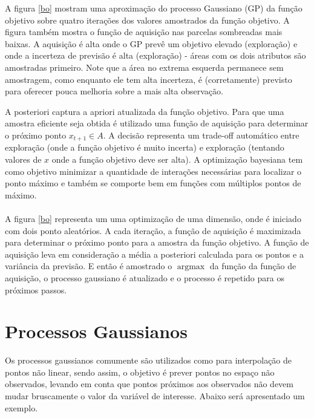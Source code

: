 \documentclass[
	12pt,				%
	twoside,		%
	a4paper,		%
	chapter=TITLE,		   %
	section=TITLE,		   %
	subsection=TITLE,	   %
	subsubsection=TITLE, %
	english,			%
	french,				%
	spanish,			%
	brazil,				%
]{abntex2}
\begin{document}
A figura \ref{bo} mostram uma aproximação do processo Gaussiano (GP) da
função objetivo sobre quatro iterações dos valores amostrados da função
objetivo. A figura também mostra o função de aquisição nas parcelas
sombreadas mais baixas. A aquisição é alta onde o GP prevê um objetivo
elevado (exploração) e onde a incerteza de previsão é alta (exploração)
- áreas com os dois atributos são amostradas primeiro. Note que a área
no extrema esquerda permanece sem amostragem, como enquanto ele tem alta
incerteza, é (corretamente) previsto para oferecer pouca melhoria sobre
a mais alta observação.

A posteriori captura a apriori atualizada da função objetivo. Para que
uma amostra eficiente seja obtida é utilizado uma função de aquisição
para determinar o próximo ponto \(x_{t+1} \in A\). A decisão representa
um trade-off automático entre exploração (onde a função objetivo é muito
incerta) e exploração (tentando valores de \(x\) onde a função objetivo
deve ser alta). A optimização bayesiana tem como objetivo minimizar a
quantidade de interações necessárias para localizar o ponto máximo e
também se comporte bem em funções com múltiplos pontos de máximo.\\
~\\

A figura \ref{bo} representa um uma optimização de uma dimensão, onde é
iniciado com dois ponto aleatórios. A cada iteração, a função de
aquisição é maximizada para determinar o próximo ponto para a amostra da
função objetivo. A função de aquisição leva em consideração a média a
posteriori calculada para os pontos e a variância da previsão. E então é
amostrado o \(\operatorname{argmax}\) da função da função de aquisição,
o processo gaussiano é atualizado e o processo é repetido para os
próximos passos.\\

\hypertarget{processos-gaussianos}{%
\section{Processos Gaussianos}\label{processos-gaussianos}}

Os processos gaussianos comumente são utilizados como para interpolação
de pontos não linear, sendo assim, o objetivo é prever pontos no espaço
não observados, levando em conta que pontos próximos aos observados não
devem mudar bruscamente o valor da variável de interesse. Abaixo será
apresentado um exemplo.\\
\end{document}
